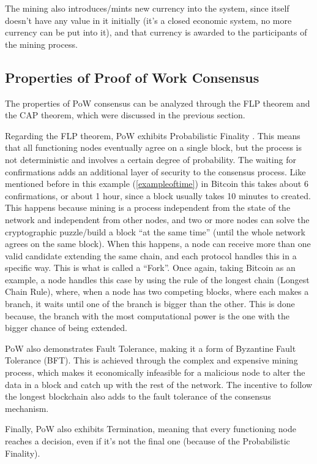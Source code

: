 The mining also introduces/mints new currency into the system, since itself doesn't have any value in it initially (it's a closed economic system, no more currency can be put into it), and that currency is awarded to the participants of the mining process.


\subsection*{Properties of Proof of Work Consensus}

The properties of PoW consensus can be analyzed through the FLP theorem and the CAP theorem, which were discussed in the previous section.

Regarding the FLP theorem, PoW exhibits Probabilistic Finality \cite{anceaume2020finality}. This means that all functioning nodes eventually agree on a single block, but the process is not deterministic and involves a certain degree of probability. The waiting for confirmations adds an additional layer of security to the consensus process. Like mentioned before in this example (\ref{exampleoftime}) in Bitcoin this takes about 6 confirmations, or about 1 hour, since a block usually takes 10 minutes to created. This happens because mining is a process independent from the state of the network and independent from other nodes, and two or more nodes can solve the cryptographic puzzle/build a block ``at the same time'' (until the whole network agrees on the same block).
When this happens, a node can receive more than one valid candidate extending the same chain, and each protocol handles this in a specific way. This is what is called a ``Fork''.
Once again, taking Bitcoin as an example, a node handles this case by using the rule of the longest chain (Longest Chain Rule), where, when a node has two competing blocks, where each makes a branch, it waits until one of the branch is bigger than the other.
This is done because, the branch with the most computational power is the one with the bigger chance of being extended.

PoW also demonstrates Fault Tolerance, making it a form of Byzantine Fault Tolerance (BFT). This is achieved through the complex and expensive mining process, which makes it economically infeasible for a malicious node to alter the data in a block and catch up with the rest of the network. The incentive to follow the longest blockchain also adds to the fault tolerance of the consensus mechanism.

Finally, PoW also exhibits Termination, meaning that every functioning node reaches a decision, even if it's not the final one (because of the Probabilistic Finality). 

